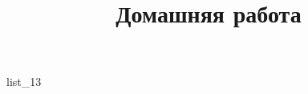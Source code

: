 \documentclass[12pt, a4paper]{article}
\begin{document}
	\title{Домашняя работа}
	{list_13}
\end{document}
